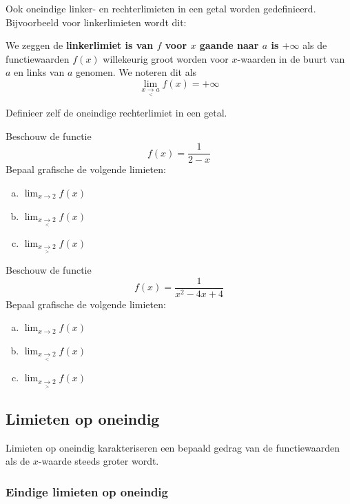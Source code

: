\documentclass[12pt,twoside,a4paper]{article}
\newenvironment{definitie}
{
  \vspace{0.4cm}
  \begin{mdframed}[nobreak=true,frametitle={Definitie}]
  }{%
  \end{mdframed}
}
\begin{document}
Ook oneindige linker- en rechterlimieten in een getal worden gedefinieerd. Bijvoorbeeld voor linkerlimieten wordt dit:

\begin{definitie}
  We zeggen de {\bf linkerlimiet is van $f$ voor $x$ gaande naar $a$ is $+\infty$} als de functiewaarden $f(x)$ willekeurig groot worden voor $x$-waarden in de buurt van $a$ en links van $a$ genomen. We noteren dit als
  $$\lim_{x\underset{<}{\to}a}f(x)=+\infty$$
\end{definitie}

\begin{oefening}
  Definieer zelf de oneindige rechterlimiet in een getal.
\end{oefening}

\begin{oefening}
Beschouw de functie
$$f(x)=\dfrac{1}{2-x}$$
Bepaal grafische de volgende limieten:
\begin{enumerate}[(a)]
  \itemsep.5em
  \item $\displaystyle\lim_{x\to 2} f(x)$
  \item $\displaystyle\lim_{x\underset{<}{\to} 2} f(x)$
  \item $\displaystyle\lim_{x\underset{>}{\to} 2} f(x)$
\end{enumerate}
\end{oefening}

\begin{oefening}
Beschouw de functie
$$f(x)=\dfrac{1}{x^2-4x+4}$$
Bepaal grafische de volgende limieten:
\begin{enumerate}[(a)]
  \itemsep.5em
  \item $\displaystyle\lim_{x\to 2} f(x)$
  \item $\displaystyle\lim_{x\underset{<}{\to} 2} f(x)$
  \item $\displaystyle\lim_{x\underset{>}{\to} 2} f(x)$
\end{enumerate}
\end{oefening}

\subsection{Limieten op oneindig}

Limieten op oneindig karakteriseren een bepaald gedrag van de functiewaarden als de $x$-waarde steeds groter wordt.

\subsubsection*{Eindige limieten op oneindig}
\end{document}
